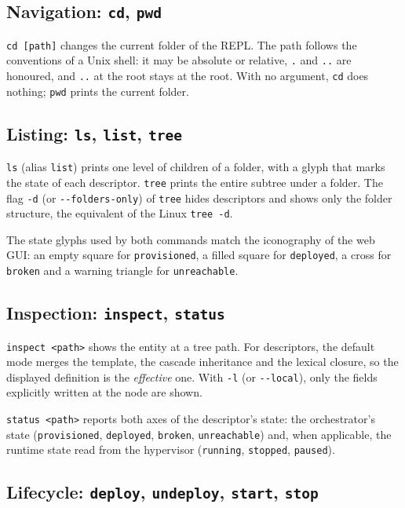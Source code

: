 \subsection{Navigation: \texttt{cd}, \texttt{pwd}}

\texttt{cd [path]} changes the current folder of the REPL. The path
follows the conventions of a Unix shell: it may be absolute or
relative, \texttt{.} and \texttt{..} are honoured, and \texttt{..} at
the root stays at the root. With no argument, \texttt{cd} does
nothing; \texttt{pwd} prints the current folder.

\subsection{Listing: \texttt{ls}, \texttt{list}, \texttt{tree}}

\texttt{ls} (alias \texttt{list}) prints one level of children of a
folder, with a glyph that marks the state of each descriptor.
\texttt{tree} prints the entire subtree under a folder. The flag
\texttt{-d} (or \texttt{-{}-folders-only}) of \texttt{tree} hides
descriptors and shows only the folder structure, the equivalent of
the Linux \texttt{tree -d}.

The state glyphs used by both commands match the iconography of the
web GUI: an empty square for \texttt{provisioned}, a filled square
for \texttt{deployed}, a cross for \texttt{broken} and a warning
triangle for \texttt{unreachable}.

\subsection{Inspection: \texttt{inspect}, \texttt{status}}

\texttt{inspect <path>} shows the entity at a tree path. For
descriptors, the default mode merges the template, the cascade
inheritance and the lexical closure, so the displayed definition is
the \emph{effective} one. With \texttt{-l} (or \texttt{-{}-local}),
only the fields explicitly written at the node are shown.

\texttt{status <path>} reports both axes of the descriptor's state:
the orchestrator's state (\texttt{provisioned}, \texttt{deployed},
\texttt{broken}, \texttt{unreachable}) and, when applicable, the
runtime state read from the hypervisor (\texttt{running},
\texttt{stopped}, \texttt{paused}).

\subsection{Lifecycle: \texttt{deploy}, \texttt{undeploy}, \texttt{start}, \texttt{stop}}

